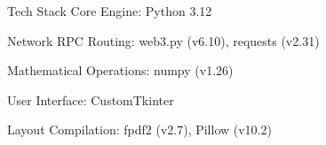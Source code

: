 Tech Stack
Core Engine: Python 3.12

Network RPC Routing: web3.py (v6.10), requests (v2.31)

Mathematical Operations: numpy (v1.26)

User Interface: CustomTkinter

Layout Compilation: fpdf2 (v2.7), Pillow (v10.2)
